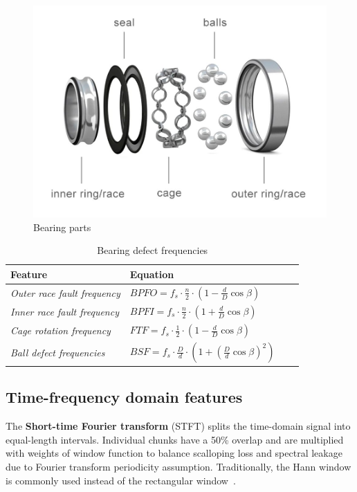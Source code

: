 \begin{figure}[h]
    \centering
    \includegraphics[width=\textwidth]{assets/analysis/bearing-parts.jpg}
    \caption{Bearing parts~\cite{lu_what_is_ball_bearing_2023}}
    \label{fig:bearing-parts}
\end{figure}

\begin{table}[h]
\centering
\renewcommand{\arraystretch}{2}
\begin{tabular}{|l|l|l|l|}
\hline
\textbf{Feature}            & \textbf{Equation}                                                                   
 \\ \hline
\textit{Outer race fault frequency} & $ BPFO = f_s \cdot \frac{n}{2} \cdot \left(1 - \frac{d}{D}\cos \beta \right)$               
\\ \hline
\textit{Inner race fault frequency} & $ BPFI = f_s \cdot \frac{n}{2} \cdot \left(1 + \frac{d}{D}\cos \beta \right)$
\\ \hline
\textit{Cage rotation frequency}    & $ FTF = f_s \cdot \frac{1}{2} \cdot \left(1 - \frac{d}{D}\cos \beta \right) $      
\\ \hline
\textit{Ball defect frequencies} & $ BSF = f_s \cdot \frac{D}{d} \cdot \left(1 + \left(\frac{D}{d}\cos \beta\right)^2 \right) $
\\ \hline
\end{tabular}
\caption{Bearing defect frequencies}
\label{tab:bearing-defect-features}
\end{table}

\subsection{Time-frequency domain features}
The \textbf{Short-time Fourier transform} (STFT) splits the time-domain signal into equal-length intervals. Individual chunks have a 50\% overlap and are multiplied with weights of window function to balance scalloping loss and spectral leakage due to Fourier transform periodicity assumption. Traditionally, the Hann window is commonly used instead of the rectangular window~\cite{ziaran_technicka_2013,noauthor_iso_2016_2}.

